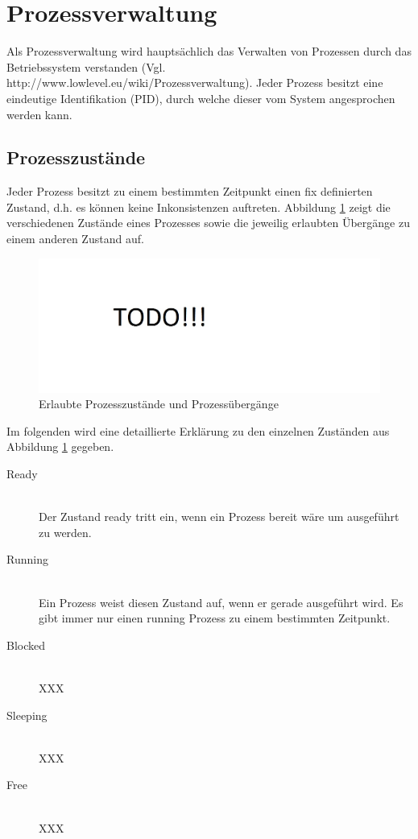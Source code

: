 \section{Prozessverwaltung}
Als Prozessverwaltung wird hauptsächlich das Verwalten von Prozessen durch das Betriebssystem verstanden (Vgl. http://www.lowlevel.eu/wiki/Prozessverwaltung). Jeder Prozess besitzt eine eindeutige Identifikation (PID), durch welche dieser vom System angesprochen werden kann. 

\subsection{Prozesszustände}
Jeder Prozess besitzt zu einem bestimmten Zeitpunkt einen fix definierten Zustand, d.h. es können keine Inkonsistenzen auftreten. Abbildung \ref{fig:Process-states} zeigt die verschiedenen Zustände eines Prozesses sowie die jeweilig erlaubten Übergänge zu einem anderen Zustand auf.

\begin{figure}[H]
	\includegraphics[scale=0.60]{chapters/processmanagement/figures/todo}
	\caption{Erlaubte Prozesszustände und Prozessübergänge}
	\label{fig:Process-states}
\end{figure}

Im folgenden wird eine detaillierte Erklärung zu den einzelnen Zuständen aus Abbildung \ref{fig:Process-states} gegeben.

\begin{description}
	\item[Ready] \hfill \\
	Der Zustand ready tritt ein, wenn ein Prozess bereit wäre um ausgeführt zu werden. 
	
	\item[Running] \hfill \\
	Ein Prozess weist diesen Zustand auf, wenn er gerade ausgeführt wird. Es gibt immer nur einen running Prozess zu einem bestimmten Zeitpunkt.
	
	\item[Blocked] \hfill \\
	XXX
	
	\item[Sleeping] \hfill \\
	XXX	
	
	\item[Free] \hfill \\
	XXX
\end{description}

